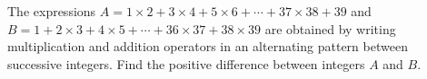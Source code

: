 The expressions $A=1\times2+3\times4+5\times6+\cdots+37\times38+39$ and $B=1+2\times3+4\times5+\cdots+36\times37+38\times39$ are obtained by writing multiplication and addition operators in an alternating pattern between successive integers. Find the positive difference between integers $A$ and $B$.